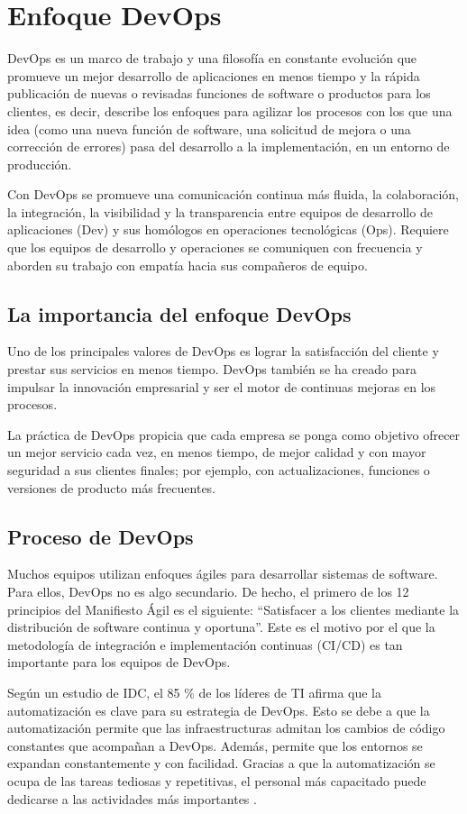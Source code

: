 \section{Enfoque DevOps}
DevOps es un marco de trabajo y una filosofía en constante evolución que promueve un mejor desarrollo de aplicaciones en menos tiempo y la rápida publicación de nuevas o revisadas funciones de software o productos para los clientes, es decir, describe los enfoques para agilizar los procesos con los que una idea (como una nueva función de software, una solicitud de mejora o una corrección de errores) pasa del desarrollo a la implementación, en un entorno de producción.

Con DevOps se promueve una comunicación continua más fluida, la colaboración, la integración, la visibilidad y la transparencia entre equipos de desarrollo de aplicaciones (Dev) y sus homólogos en operaciones tecnológicas (Ops). Requiere que los equipos de desarrollo y operaciones se comuniquen con frecuencia y aborden su trabajo con empatía hacia sus compañeros de equipo.

\subsection{La importancia del enfoque DevOps}
Uno de los principales valores de DevOps es lograr la satisfacción del cliente y prestar sus servicios en menos tiempo. DevOps también se ha creado para impulsar la innovación empresarial y ser el motor de continuas mejoras en los procesos.

La práctica de DevOps propicia que cada empresa se ponga como objetivo ofrecer un mejor servicio cada vez, en menos tiempo, de mejor calidad y con mayor seguridad a sus clientes finales; por ejemplo, con actualizaciones, funciones o versiones de producto más frecuentes.

\subsection{Proceso de DevOps}
Muchos equipos utilizan enfoques ágiles para desarrollar sistemas de software. Para ellos, DevOps no es algo secundario. De hecho, el primero de los 12 principios del Manifiesto Ágil es el siguiente: ``Satisfacer a los clientes mediante la distribución de software continua y oportuna''. Este es el motivo por el que la metodología de integración e implementación continuas (CI/CD) es tan importante para los equipos de DevOps.

Según un estudio de IDC, el 85 \% de los líderes de TI afirma que la automatización es clave para su estrategia de DevOps. Esto se debe a que la automatización permite que las infraestructuras admitan los cambios de código constantes que acompañan a DevOps. Además, permite que los entornos se expandan constantemente y con facilidad. Gracias a que la automatización se ocupa de las tareas tediosas y repetitivas, el personal más capacitado puede dedicarse a las actividades más importantes \cite{redHatDevOps}.

